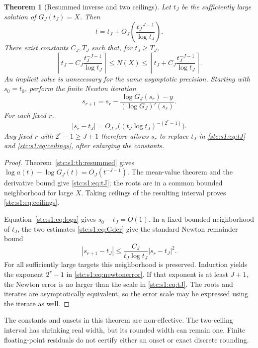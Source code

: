 \documentclass[11pt,letterpaper]{article}
\numberwithin{equation}{section}
\newtheorem{theorem}{Theorem}[section]
\theoremstyle{remark}\newtheorem{remark}[theorem]{Remark}
\newcommand{\ceil}[1]{\left\lceil #1\right\rceil}
\begin{document}
\begin{theorem}[Resummed inverse and two ceilings]\label{stc:s1:th:newton}
Let $t_J$ be the sufficiently large solution of $G_J(t_J)=X$. Then
\begin{equation}\label{stc:s1:eq:tJ}
 t=t_J+O_J\left(\frac{t_J^{-J-1}}{\log t_J}\right).
\end{equation}
There exist constants $C_J,T_J$ such that, for $t_J\geq T_J$,
\begin{equation}\label{stc:s1:eq:ceilings}
 \ceil{t_J-C_J\frac{t_J^{-J-1}}{\log t_J}}
 \leq N(X)\leq
 \ceil{t_J+C_J\frac{t_J^{-J-1}}{\log t_J}}.
\end{equation}
An implicit solve is unnecessary for the same asymptotic precision. Starting with $s_0=t_0$, perform the finite Newton iteration
\begin{equation}\label{stc:s1:eq:newton}
 s_{r+1}=s_r-\frac{\log G_J(s_r)-y}{(\log G_J)'(s_r)}.
\end{equation}
For each fixed $r$,
\begin{equation}\label{stc:s1:eq:newtonerror}
 |s_r-t_J|=O_{J,r}\bigl((t_J\log t_J)^{-(2^r-1)}\bigr).
\end{equation}
Any fixed $r$ with $2^r-1\geq J+1$ therefore allows $s_r$ to replace $t_J$ in \eqref{stc:s1:eq:tJ} and \eqref{stc:s1:eq:ceilings}, after enlarging the constants.
\end{theorem}
\begin{proof}
Theorem~\ref{stc:s1:th:resummed} gives $\log a(t)-\log G_J(t)=O_J(t^{-J-1})$. The mean-value theorem and the derivative bound give \eqref{stc:s1:eq:tJ}; the roots are in a common bounded neighborhood for large $X$. Taking ceilings of the resulting interval proves \eqref{stc:s1:eq:ceilings}.

Equation~\eqref{stc:s1:eq:loga} gives $s_0-t_J=O(1)$. In a fixed bounded neighborhood of $t_J$, the two estimates \eqref{stc:s1:eq:Gder} give the standard Newton remainder bound
\[
 |s_{r+1}-t_J|\leq\frac{C_J}{t_J\log t_J}|s_r-t_J|^2.
\]
For all sufficiently large targets this neighborhood is preserved. Induction yields the exponent $2^r-1$ in \eqref{stc:s1:eq:newtonerror}. If that exponent is at least $J+1$, the Newton error is no larger than the scale in \eqref{stc:s1:eq:tJ}. The roots and iterates are asymptotically equivalent, so the error scale may be expressed using the iterate as well.
\end{proof}
The constants and onsets in this theorem are non-effective. The two-ceiling interval has shrinking real width, but its rounded width can remain one. Finite floating-point residuals do not certify either an onset or exact discrete rounding.
\end{document}
